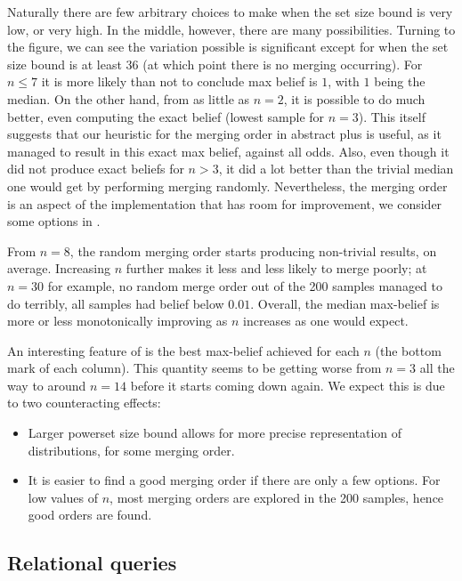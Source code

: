 Naturally there are few arbitrary choices to make when the set size
bound is very low, or very high. In the middle, however, there are
many possibilities. Turning to the figure, we can see the variation
possible is significant except for when the set size bound is at least
36 (at which point there is no merging occurring). For $ n \leq 7 $ it
is more likely than not to conclude max belief is $ 1 $, with $ 1 $
being the median. On the other hand, from as little as $ n = 2 $, it
is possible to do much better, even computing the exact belief (lowest
sample for $ n = 3 $). This itself suggests that our heuristic for the
merging order in abstract plus is useful, as it managed to result in
this exact max belief, against all odds. Also, even though it did not
produce exact beliefs for $ n > 3 $, it did a lot better than the
trivial median one would get by performing merging
randomly. Nevertheless, the merging order is an aspect of the
implementation that has room for improvement, we consider some options
in .

From $ n = 8 $, the random merging order starts producing non-trivial
results, on average. Increasing $ n $ further makes it less and less
likely to merge poorly; at $ n = 30 $ for example, no random merge
order out of the 200 samples managed to do terribly, all samples had
belief below $ 0.01 $. Overall, the median max-belief is more or less
monotonically improving as $ n $ increases as one would expect.

An interesting feature of  is the best max-belief
achieved for each $ n $ (the bottom mark of each column). This
quantity seems to be getting worse from $ n = 3 $ all the way to
around $ n = 14 $ before it starts coming down again. We expect this
is due to two counteracting effects:
\begin{itemize}
\item{} Larger powerset size bound allows for more precise
  representation of distributions, for some merging order.
\item{} It is easier to find a good merging order if there are only a
  few options. For low values of $ n $, most merging orders are
  explored in the 200 samples, hence good orders are found.
\end{itemize}

\subsection{Relational queries} \label{sec:relational}


